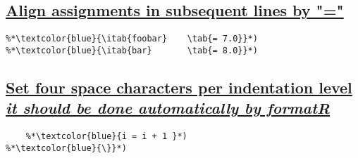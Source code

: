 \documentclass{article}
\begin{document}
\subsection{\label{align-assign}\hyperref[align-assign-ini]{Align assignments in subsequent lines by "="}}
\newcommand{\itab}[1]{\hspace{0em}\rlap{#1}}
\newcommand{\tab}[1]{\hspace{.1\textwidth}\rlap{#1}}
\begin{lstlisting}[frame=single]
%*\textcolor{blue}{\itab{foo}  \tab{= 5.0}}*)
%*\textcolor{blue}{\itab{foobar} 	\tab{= 7.0}}*)
%*\textcolor{blue}{\itab{bar} 		\tab{= 8.0}}*)
\end{lstlisting}

\subsection{\label{indentation}\hyperref[indentation-ini]{Set four space characters per indentation level {\it it should be done automatically by formatR}}}
\begin{lstlisting}[frame=single]
%*\textcolor{blue}{while (i \textless n)\{}*)
    %*\textcolor{blue}{i = i + 1 }*)
%*\textcolor{blue}{\}}*)
\end{lstlisting}
\end{document}
